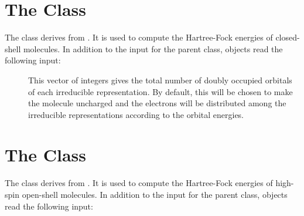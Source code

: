 
\section{The  Class}
\label{CLSCF}

The  class derives from .  It is used to compute
the Hartree-Fock energies of closed-shell molecules.  In addition to the
input for the  parent class,  objects read the
following input:

\begin{description}
  \item[] This vector of integers gives the total number of
     doubly occupied orbitals of each irreducible representation.  By
     default, this will be chosen to make the molecule uncharged and the
     electrons will be distributed among the irreducible representations
     according to the orbital energies.

\end{description}


\section{The  Class}
\label{HSOSSCF}

The  class derives from .  It is used to
compute the Hartree-Fock energies of high-spin open-shell molecules.  In
addition to the input for the  parent class, 
objects read the following input:

